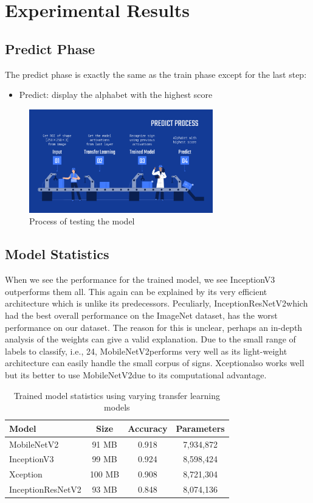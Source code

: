 \documentclass[twocolumn]{article}
\newcommand{\mobilenet}{MobileNetV2}
\newcommand{\xception}{Xception}
\newcommand{\inception}{InceptionV3}
\newcommand{\resnet}{InceptionResNetV2}
\begin{document}
\section{Experimental Results}

\subsection{Predict Phase}

The predict phase is exactly the same as the train phase except for the last 
step:
\begin{itemize}
	\item Predict: display the alphabet with the highest score
\end{itemize}

\begin{figure}[h]
\centering
\includegraphics[width=8cm]{./figures/predict process}
\caption{Process of testing the model}
\end{figure}

\subsection{Model Statistics}

When we see the performance for the trained model, we see \inception 
outperforms them all. This again can be explained by its very efficient 
architecture which is unlike its predecessors. Peculiarly, \resnet which had 
the best overall performance on the ImageNet dataset, has the worst 
performance on our dataset. The reason for this is unclear, perhaps an 
in-depth analysis of the weights can give a valid explanation. Due to the 
small range of labels to classify, i.e., 24, \mobilenet performs very well as 
its light-weight architecture can easily handle the small corpus of signs. 
\xception also works well but its better to use \mobilenet due to its 
computational advantage.

\begin{table}[h]
\begin{tabular}{ |l|c|c|c| }
	\hline
	\textbf{Model} & \textbf{Size} & \textbf{Accuracy} & \textbf{Parameters} \\ \hline
	\mobilenet & 91 MB & 0.918 & 7,934,872 \\ \hline
	\inception & 99 MB & 0.924 & 8,598,424 \\ \hline
	\xception & 100 MB & 0.908 & 8,721,304 \\ \hline
	\resnet & 93 MB & 0.848 & 8,074,136 \\
	\hline
\end{tabular}
\caption{Trained model statistics using varying transfer learning models}
\end{table}
\end{document}

